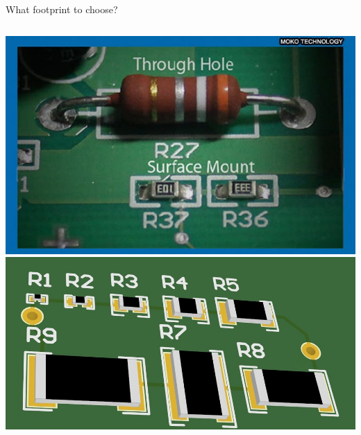 \documentclass{beamer}
\begin{document}
\begin{frame}{What footprint to choose?}
  \begin{columns}
    \includegraphics[width=\textwidth]{images/resistor-tht-vs-smd.png}
    \includegraphics[width=\textwidth]{images/resistor-footprints.png}
  \end{columns}
\end{frame}
\end{document}
